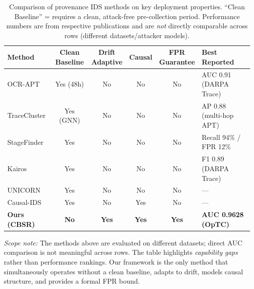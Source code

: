 \begin{table}[t]
\centering
\small
\caption{Comparison of provenance IDS methods on key deployment properties. ``Clean Baseline'' = requires a clean, attack-free pre-collection period. Performance numbers are from respective publications and are \emph{not} directly comparable across rows (different datasets/attacker models).}
\begin{tabularx}{\textwidth}{Xccccl}
\toprule
Method & \makecell{Clean\\Baseline} & \makecell{Drift\\Adaptive} & Causal & \makecell{FPR\\Guarantee} & Best Reported \\
\midrule
OCR-APT \cite{ocrapt2025}            & Yes (48h)   & No  & No  & No  & AUC 0.91 (DARPA Trace) \\
TraceCluster \cite{tracecluster2026} & Yes (GNN)   & No  & No  & No  & AP 0.88 (multi-hop APT) \\
StageFinder \cite{stagefinder2026}   & Yes         & No  & No  & No  & Recall 94\% / FPR 12\% \\
Kairos \cite{cheng2024kairos}        & Yes         & No  & No  & No  & F1 0.89 (DARPA Trace) \\
UNICORN \cite{han2020unicorn}        & Yes         & No  & No  & No  & --- \\
Causal-IDS \cite{causalids2026}      & Yes         & No  & Yes & No  & --- \\
\textbf{Ours (CBSR)}                 & \textbf{No} & \textbf{Yes} & \textbf{Yes} & \textbf{Yes} & \textbf{AUC 0.9628 (OpTC)} \\
\bottomrule
\end{tabularx}
\label{tab:related_comparison}
\end{table}

\noindent\textit{Scope note:} The methods above are evaluated on different datasets; direct AUC comparison is not meaningful across rows. The table highlights \emph{capability gaps} rather than performance rankings. Our framework is the only method that simultaneously operates without a clean baseline, adapts to drift, models causal structure, and provides a formal FPR bound.
